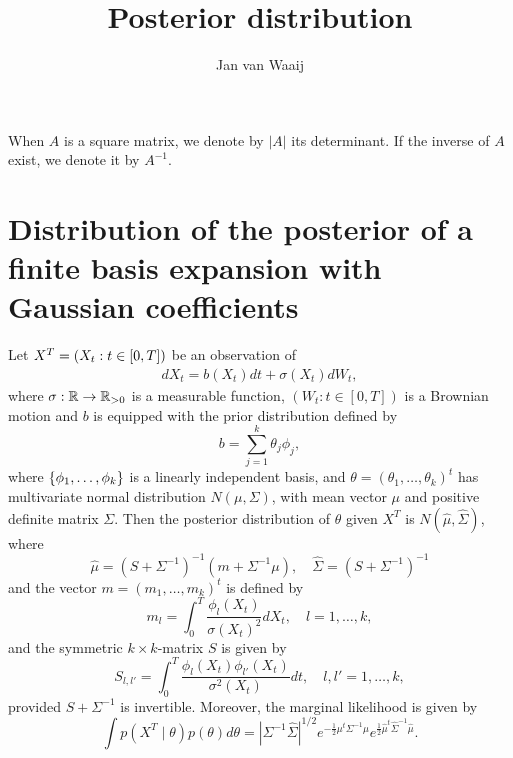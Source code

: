 \documentclass[12pt]{article}
\title{Posterior distribution}
\author{Jan van Waaij}
\begin{document}
\begin{notation}
    When $A$ is a square matrix, we denote by $|A|$ its determinant. If the inverse of $A$ exist, we denote it by $A^{-1}$. 
\end{notation}

\section{Distribution of the posterior of a finite basis expansion with Gaussian coefficients}

\begin{lemma}\label{lem:posteriordistribution}
	Let \(X^T=\left(X_t:t\in[0,T]\right)\) be an observation of 
	\begin{align*}
		dX_t=b(X_t)dt+\sigma(X_t)dW_t,
	\end{align*}
	where  \(\sigma:\operatorname{\mathbb{R}}\to \operatorname{\mathbb{R}}_{>0}\) is a  measurable function, $(W_t:t\in[0,T])$ is a Brownian motion and \(b\) is equipped with the prior distribution defined by 
	\[
	b=\sum_{j=1}^k\theta_j\phi_j,
	\]
	where \(\left\{ \phi_1,\ldots,\phi_k \right\}\) is a linearly independent basis, and \(\theta=(\theta_1,\ldots,\theta_k)^t\) has multivariate normal distribution \(N(\mu,\Sigma)\), with mean vector $\mu$ and positive definite matrix $\Sigma$. Then the  posterior distribution of \(\theta\) given $X^T$ is \(N(\hat\mu,\hat\Sigma)\), where \[\hat\mu=(S+\Sigma^{-1})^{-1}(m+\Sigma^{-1}\mu),\quad\hat\Sigma= (S+\Sigma^{-1})^{-1}\] and the vector \(m=(m_1,\ldots,m_k)^t\) is defined by 
	\[
	m_l=\int_0^T\frac{\phi_l(X_t)}{\sigma(X_t)^2}dX_t, \quad l=1,\ldots,k,
	\] 
	and the symmetric \(k\times k\)-matrix \(S\) is given by 
	\begin{equation}\label{eq:girsanovmatrix}
	S_{l,l'}=\int_0^T\frac{\phi_l(X_t)\phi_{l'}(X_t)}{\sigma^2(X_t)}dt,\quad l,l'=1,\ldots,k,
	\end{equation}
	provided \(S+\Sigma^{-1}\) is invertible. 
	Moreover, the marginal likelihood is given by 
	\[
\int p(X^T\mid \theta)p(\theta)d\theta=	|\Sigma^{-1}\hat\Sigma|^{1/2}e^{-\frac12\mu^t\Sigma^{-1}\mu} e^{\frac12\hat\mu^t\hat\Sigma^{-1}\hat\mu}.
	\]
	
\end{lemma}
\end{document}
